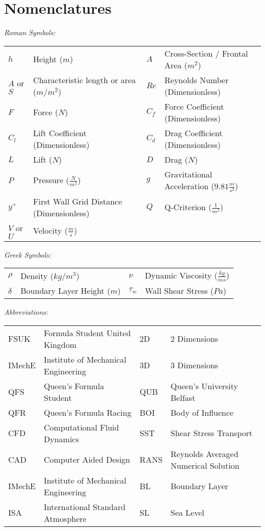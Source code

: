 \newpage
\thispagestyle{empty}
\section*{Nomenclatures} 
\flushleft
\begin{doublespace}
\textit{Roman Symbols:}

\begin{tabular}{l l  l l }
$h$ & Height ($m$) & $A$ & Cross-Section / Frontal Area ($m^2$) \\
$A$ or $S$ & Characteristic length or area ($m$/$m^2$) & $Re$ & Reynolds Number (Dimensionless) \\
$F$ & Force ($N$) & $C_f$ & Force Coefficient (Dimensionless)\\
$C_l$ & Lift Coefficient (Dimensionless) & $C_d$ & Drag Coefficient (Dimensionless) \\
$L$ & Lift ($N$) & $D$ & Drag ($N$) \\
$P$ & Pressure ($\frac{N}{m^2}$) & $g$ & Gravitational Acceleration ($9.81\frac{m}{s^2}$)\\
$y^+$ & First Wall Grid Distance (Dimensionless) & $Q$ & Q-Criterion ($\frac{1}{m^2}$) \\
$V$ or $U$ & Velocity ($\frac{m}{s}$) & \\
\end{tabular}

\textit{Greek Symbols:}

\begin{tabular}{llll}
$\rho$ & Density ($kg/m^3$) & $\nu$ & Dynamic Viscosity ($\frac{kg}{ms}$) \\
$\delta$ & Boundary Layer Height ($m$) & $\tau_w$ & Wall Shear Stress ($Pa$)\\
\end{tabular}


\textit{Abbreviations:}

\begin{tabular}{llll}
FSUK & Formula Student United Kingdom & 2D & 2 Dimensions \\
IMechE & Institute of Mechanical Engineering & 3D & 3 Dimensions\\
QFS & Queen's Formula Student & QUB & Queen's University Belfast\\
QFR & Queen's Formula Racing & BOI & Body of Influence\\
CFD & Computational Fluid Dynamics & SST & Shear Stress Transport\\
CAD & Computer Aided Design & RANS & Reynolds Averaged Numerical Solution\\
IMechE & Institute of Mechanical Engineering & BL & Boundary Layer\\
ISA & International Standard Atmosphere & SL & Sea Level\\
\end{tabular}
\end{doublespace}